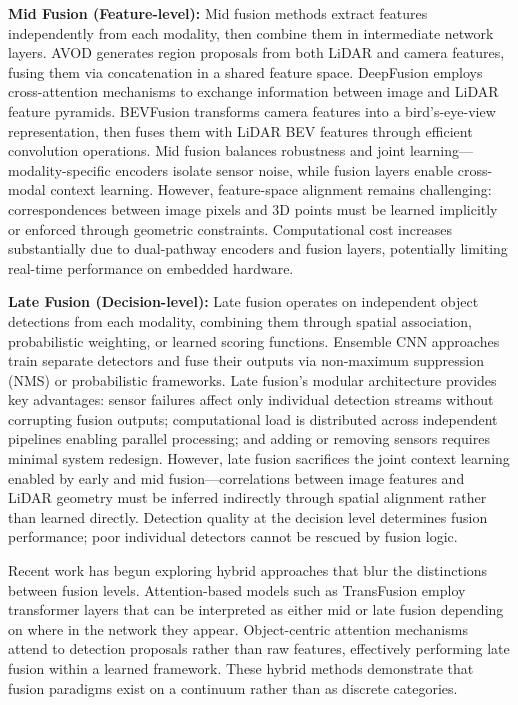 \documentclass{erauthesis}
\begin{document}
\textbf{Mid Fusion (Feature-level):} Mid fusion methods extract features independently from each modality, then combine them in intermediate network layers. AVOD \cite{ku2018} generates region proposals from both LiDAR and camera features, fusing them via concatenation in a shared feature space. DeepFusion \cite{li2022deepfusion} employs cross-attention mechanisms to exchange information between image and LiDAR feature pyramids. BEVFusion \cite{liu2023bevfusion} transforms camera features into a bird's-eye-view representation, then fuses them with LiDAR BEV features through efficient convolution operations. Mid fusion balances robustness and joint learning—modality-specific encoders isolate sensor noise, while fusion layers enable cross-modal context learning. However, feature-space alignment remains challenging: correspondences between image pixels and 3D points must be learned implicitly or enforced through geometric constraints. Computational cost increases substantially due to dual-pathway encoders and fusion layers, potentially limiting real-time performance on embedded hardware.

\textbf{Late Fusion (Decision-level):} Late fusion operates on independent object detections from each modality, combining them through spatial association, probabilistic weighting, or learned scoring functions. Ensemble CNN approaches train separate detectors and fuse their outputs via non-maximum suppression (NMS) or probabilistic frameworks. Late fusion's modular architecture provides key advantages: sensor failures affect only individual detection streams without corrupting fusion outputs; computational load is distributed across independent pipelines enabling parallel processing; and adding or removing sensors requires minimal system redesign. However, late fusion sacrifices the joint context learning enabled by early and mid fusion—correlations between image features and LiDAR geometry must be inferred indirectly through spatial alignment rather than learned directly. Detection quality at the decision level determines fusion performance; poor individual detectors cannot be rescued by fusion logic.

Recent work has begun exploring hybrid approaches that blur the distinctions between fusion levels. Attention-based models such as TransFusion \cite{bai2022transfusion} employ transformer layers that can be interpreted as either mid or late fusion depending on where in the network they appear. Object-centric attention mechanisms attend to detection proposals rather than raw features, effectively performing late fusion within a learned framework. These hybrid methods demonstrate that fusion paradigms exist on a continuum rather than as discrete categories.
\end{document}
